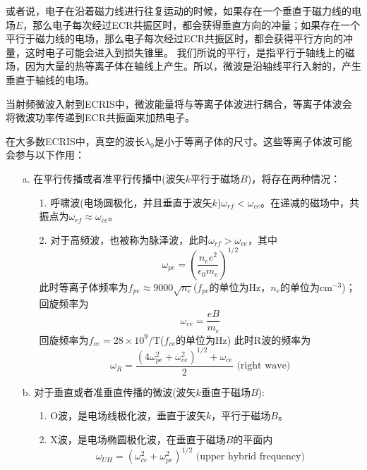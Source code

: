 \documentclass[fontset=windows]{article}
\begin{document}
或者说，电子在沿着磁力线进行往复运动的时候，如果存在一个垂直于磁力线的电场$E$，那么电子每次经过ECR共振区时，都会获得垂直方向的冲量；如果存在一个平行于磁力线的电场，那么电子每次经过ECR共振区时，都会获得平行方向的冲量，这时电子可能会进入到损失锥里。
我们所说的平行，是指平行于轴线上的磁场，因为大量的热等离子体在轴线上产生。所以，微波是沿轴线平行入射的，产生垂直于轴线的电场。

当射频微波入射到ECRIS中，微波能量将与等离子体波进行耦合，等离子体波会将微波功率传递到ECR共振面来加热电子。

在大多数ECRIS中，真空的波长$\lambda_0$是小于等离子体的尺寸。这些等离子体波可能会参与以下作用：

\begin{enumerate}
    \item [a.]在平行传播或者准平行传播中(波矢$k$平行于磁场$B$)，将存在两种情况：
    \begin{enumerate}
        \item[1.]呼啸波(电场圆极化，并且垂直于波矢$k$)$\omega_{rf}<\omega_{ce}$。在递减的磁场中，共振点为$\omega_{rf}\approx\omega_{ce}$。\
        \item[2.]对于高频波，也被称为脉泽波，此时$\omega_{rf}>\omega_{ce}$，其中
        \begin{equation}
            \omega_{pe}=(\frac{n_ee^2}{\epsilon_0m_e})^{1/2}
        \end{equation}
        此时等离子体频率为$f_{pe}\approx9000\sqrt{n_e}$($f_{pe}$的单位为Hz，$n_e$的单位为cm$^{-3}$)；回旋频率为
        \begin{equation}
            \omega_{ce}=\frac{eB}{m_e}
        \end{equation}
        回旋频率为$f_{ce}=28\times10^9/\text{T}$($f_{ce}$的单位为Hz)
        此时R波的频率为
        \begin{equation}
            \omega_R=\frac{(4\omega_{pe}^2+\omega_{ce}^2)^{1/2}+\omega_{ce}}{2} \text{  (right wave)}
        \end{equation}
    \end{enumerate}
    \item[b.]对于垂直或者准垂直传播的微波(波矢$k$垂直于磁场$B$):
    \begin{enumerate}
        \item [1.]O波，是电场线极化波，垂直于波矢$k$，平行于磁场$B$。
        \item [2.]X波，是电场椭圆极化波，在垂直于磁场$B$的平面内
        \begin{equation}
            \omega_{UH}=(\omega_{ce}^2+\omega_{pe}^2)^{1/2}\text{  (upper hybrid frequency)}

\end{equation}
\end{enumerate}
\end{enumerate}
\end{document}
